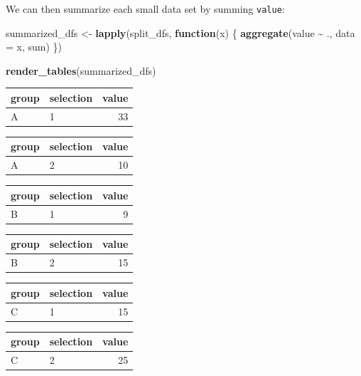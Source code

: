 \documentclass[
]{book}
\newenvironment{Shaded}{\begin{snugshade}}{\end{snugshade}}
\newcommand{\AttributeTok}[1]{\textcolor[rgb]{0.13,0.29,0.53}{#1}}
\newcommand{\ControlFlowTok}[1]{\textcolor[rgb]{0.13,0.29,0.53}{\textbf{#1}}}
\newcommand{\FunctionTok}[1]{\textcolor[rgb]{0.13,0.29,0.53}{\textbf{#1}}}
\newcommand{\NormalTok}[1]{#1}
\newcommand{\OtherTok}[1]{\textcolor[rgb]{0.56,0.35,0.01}{#1}}
\newcommand{\SpecialCharTok}[1]{\textcolor[rgb]{0.81,0.36,0.00}{\textbf{#1}}}
\theoremstyle{definition}
\theoremstyle{definition}
\theoremstyle{definition}
\theoremstyle{definition}
\theoremstyle{remark}
\begin{document}
We can then summarize each small data set by summing \texttt{value}:

\begin{Shaded}
\begin{Highlighting}[]
\NormalTok{summarized\_dfs }\OtherTok{\textless{}{-}} \FunctionTok{lapply}\NormalTok{(split\_dfs, }\ControlFlowTok{function}\NormalTok{(x) \{}
  \FunctionTok{aggregate}\NormalTok{(value }\SpecialCharTok{\textasciitilde{}}\NormalTok{ ., }\AttributeTok{data =}\NormalTok{ x, sum)}
\NormalTok{\})}

\FunctionTok{render\_tables}\NormalTok{(summarized\_dfs)}
\end{Highlighting}
\end{Shaded}

\begin{table}
\begin{table}
\centering
\begin{tabular}{l|l|r}
\hline
group & selection & value\\
\hline
A & 1 & 33\\
\hline
\end{tabular}
\end{table}\begin{table}
\centering
\begin{tabular}{l|l|r}
\hline
group & selection & value\\
\hline
A & 2 & 10\\
\hline
\end{tabular}
\end{table}
\end{table}\begin{table}
\begin{table}
\centering
\begin{tabular}{l|l|r}
\hline
group & selection & value\\
\hline
B & 1 & 9\\
\hline
\end{tabular}
\end{table}\begin{table}
\centering
\begin{tabular}{l|l|r}
\hline
group & selection & value\\
\hline
B & 2 & 15\\
\hline
\end{tabular}
\end{table}
\end{table}\begin{table}
\begin{table}
\centering
\begin{tabular}{l|l|r}
\hline
group & selection & value\\
\hline
C & 1 & 15\\
\hline
\end{tabular}
\end{table}\begin{table}
\centering
\begin{tabular}{l|l|r}
\hline
group & selection & value\\
\hline
C & 2 & 25\\
\hline
\end{tabular}
\end{table}
\end{table}
\end{document}
